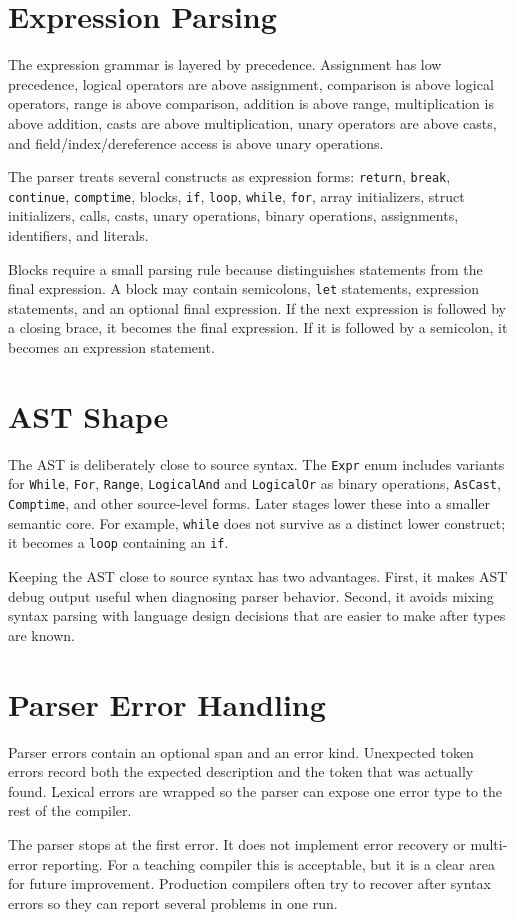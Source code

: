 \section{Expression Parsing}

The expression grammar is layered by precedence. Assignment has low precedence,
logical operators are above assignment, comparison is above logical operators,
range is above comparison, addition is above range, multiplication is above
addition, casts are above multiplication, unary operators are above casts, and
field/index/dereference access is above unary operations.

The parser treats several constructs as expression forms:
\texttt{return}, \texttt{break}, \texttt{continue}, \texttt{comptime}, blocks,
\texttt{if}, \texttt{loop}, \texttt{while}, \texttt{for}, array initializers,
struct initializers, calls, casts, unary operations, binary operations,
assignments, identifiers, and literals.

Blocks require a small parsing rule because \epl{} distinguishes statements
from the final expression. A block may contain semicolons, \texttt{let}
statements, expression statements, and an optional final expression. If the next
expression is followed by a closing brace, it becomes the final expression. If it
is followed by a semicolon, it becomes an expression statement.

\section{AST Shape}

The AST is deliberately close to source syntax. The \texttt{Expr} enum includes
variants for \texttt{While}, \texttt{For}, \texttt{Range}, \texttt{LogicalAnd}
and \texttt{LogicalOr} as binary operations, \texttt{AsCast}, \texttt{Comptime},
and other source-level forms. Later stages lower these into a smaller semantic
core. For example, \texttt{while} does not survive as a distinct lower construct;
it becomes a \texttt{loop} containing an \texttt{if}.

Keeping the AST close to source syntax has two advantages. First, it makes AST
debug output useful when diagnosing parser behavior. Second, it avoids mixing
syntax parsing with language design decisions that are easier to make after
types are known.

\section{Parser Error Handling}

Parser errors contain an optional span and an error kind. Unexpected token errors
record both the expected description and the token that was actually found.
Lexical errors are wrapped so the parser can expose one error type to the rest
of the compiler.

The parser stops at the first error. It does not implement error recovery or
multi-error reporting. For a teaching compiler this is acceptable, but it is a
clear area for future improvement. Production compilers often try to recover
after syntax errors so they can report several problems in one run.
